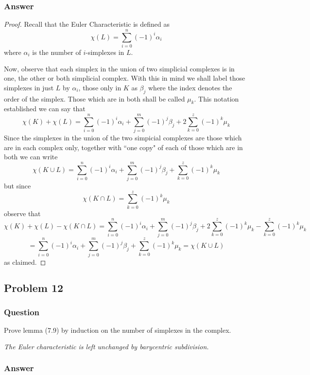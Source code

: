 \documentclass[10pt]{article}
\begin{document}
\subsubsection{Answer}
\begin{proof}
Recall that the Euler Characteristic is defined as 
\[\chi(L) = \sum_{i=0}^n (-1)^i \alpha_i\]
where $\alpha_i$ is the number of $i$-simplexes in $L$.

Now, observe that each simplex in the union of two simplicial complexes is in one, the other or both simplicial complex. With this in mind we shall label those simplexes in just $L$ by $\alpha_i$, those only in $K$ as $\beta_j$ where the index denotes the order of the simplex. Those which are in both shall be called $\mu_k$. This notation established we can say that
\[\chi(K) + \chi(L) = \sum_{i=0}^n (-1)^i \alpha_i + \sum_{j=0}^m (-1)^j \beta_j + 2\sum_{k=0}^z (-1)^k \mu_k \]
Since the simplexes in the union of the two simpicial complexes are those which are in each complex only, together with ``one copy" of each of those which are in both we can write
\[\chi(K\cup L)= \sum_{i=0}^n (-1)^i \alpha_i + \sum_{j=0}^m (-1)^j \beta_j + \sum_{k=0}^z (-1)^k \mu_k \]
but since
\[\chi(K \cap L)= \sum_{k=0}^z (-1)^k \mu_k \]
observe that
\[ \chi(K) + \chi(L) - \chi(K \cap L) = \sum_{i=0}^n (-1)^i \alpha_i + \sum_{j=0}^m (-1)^j \beta_j + 2\sum_{k=0}^z (-1)^k \mu_k  -  \sum_{k=0}^z (-1)^k \mu_k \]
\[= \sum_{i=0}^n (-1)^i \alpha_i + \sum_{j=0}^m (-1)^j \beta_j + \sum_{k=0}^z (-1)^k \mu_k =  \chi(K\cup L)\]
as claimed. 
\end{proof}

\subsection{Problem 12}

\subsubsection{Question}
Prove lemma (7.9) by induction on the number of simplexes in the complex.

\emph{The Euler characteristic is left unchanged by barycentric subdivision.}
\subsubsection{Answer}
\end{document}
